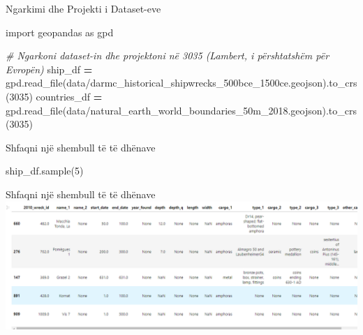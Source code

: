 \documentclass[
  ignorenonframetext,
]{beamer}
\newenvironment{Shaded}{\begin{snugshade}}{\end{snugshade}}
\newcommand{\CommentTok}[1]{\textcolor[rgb]{0.56,0.35,0.01}{\textit{#1}}}
\newcommand{\DecValTok}[1]{\textcolor[rgb]{0.00,0.00,0.81}{#1}}
\newcommand{\ImportTok}[1]{#1}
\newcommand{\NormalTok}[1]{#1}
\newcommand{\OperatorTok}[1]{\textcolor[rgb]{0.81,0.36,0.00}{\textbf{#1}}}
\newcommand{\StringTok}[1]{\textcolor[rgb]{0.31,0.60,0.02}{#1}}
\begin{document}
\begin{frame}[fragile]{Ngarkimi dhe Projekti i Dataset-eve}
\protect\hypertarget{ngarkimi-dhe-projekti-i-dataset-eve}{}

\begin{Shaded}
\begin{Highlighting}[]
\ImportTok{import}\NormalTok{ geopandas }\ImportTok{as}\NormalTok{ gpd}

\CommentTok{\# Ngarkoni dataset{-}in dhe projektoni në 3035 (Lambert, i përshtatshëm për Evropën)}
\NormalTok{ship\_df }\OperatorTok{=}\NormalTok{ gpd.read\_file(}\StringTok{\textquotesingle{}data/darmc\_historical\_shipwrecks\_500bce\_1500ce.geojson\textquotesingle{}}\NormalTok{).to\_crs(}\DecValTok{3035}\NormalTok{)}
\NormalTok{countries\_df }\OperatorTok{=}\NormalTok{ gpd.read\_file(}\StringTok{\textquotesingle{}data/natural\_earth\_world\_boundaries\_50m\_2018.geojson\textquotesingle{}}\NormalTok{).to\_crs(}\DecValTok{3035}\NormalTok{)}
\end{Highlighting}
\end{Shaded}
\end{frame}

\begin{frame}[fragile]{Shfaqni një shembull të të dhënave}
\protect\hypertarget{shfaqni-njuxeb-shembull-tuxeb-tuxeb-dhuxebnave}{}

\begin{Shaded}
\begin{Highlighting}[]
\NormalTok{ship\_df.sample(}\DecValTok{5}\NormalTok{)}
\end{Highlighting}
\end{Shaded}
\end{frame}

\begin{frame}{Shfaqni një shembull të të dhënave}
\protect\hypertarget{shfaqni-njuxeb-shembull-tuxeb-tuxeb-dhuxebnave-1}{}
\includegraphics{./Figs/ship.png}
\end{frame}
\end{document}

